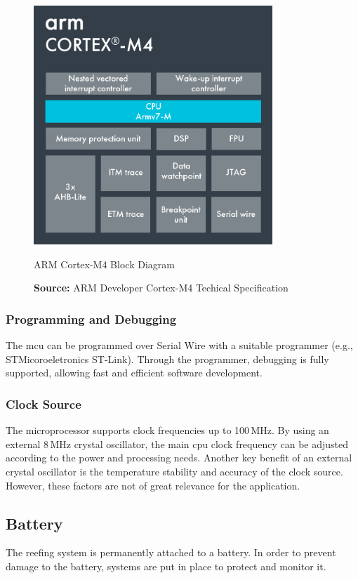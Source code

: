 \begin{figure}[h!]
	\centering
	\includegraphics[height=9cm]{images/cortrex-m4}
	\caption{ARM Cortex-M4 Block Diagram}
	\vspace{-1.4ex}
	\caption*{\textbf{Source:} ARM Developer Cortex-M4 Techical Specification \cite{arm-techspecs}}
	\label{fig:coretex-m4}
\end{figure}


\subsubsection{Programming and Debugging}
The \acrshort{mcu} can be programmed over Serial Wire with a suitable programmer (e.g., STMicoroeletronics ST-Link). Through the programmer, debugging is fully supported, allowing fast and efficient software development. 

\subsubsection{Clock Source}
The microprocessor supports clock frequencies up to 100\,MHz. By using an external 8\,MHz crystal oscillator, the main \acrshort{cpu} clock frequency can be adjusted according to the power and processing needs. Another key benefit of an external crystal oscillator is the temperature stability and accuracy of the clock source. However, these factors are not of great relevance for the application.

\subsection{Battery}
The reefing system is permanently attached to a battery. In order to prevent damage to the battery, systems are put in place to protect and monitor it. 

